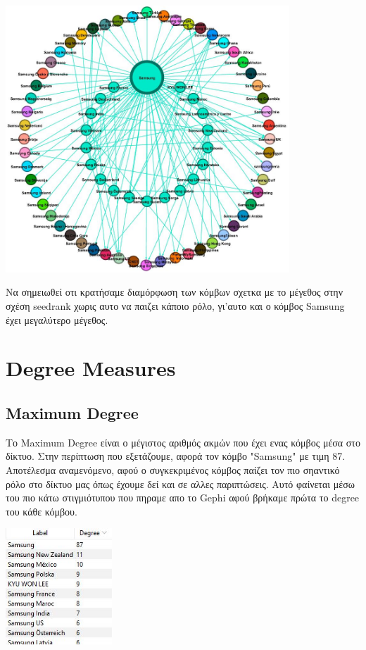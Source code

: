 \documentclass[12pt]{article}
\begin{document}
	\begin{center}
		\includegraphics[width=0.8\textwidth]{photos-files/section5/section5_photo1.JPG}
	\end{center}
	Να σημειωθεί οτι κρατήσαμε διαμόρφωση των κόμβων σχετκα με το μέγεθος στην σχέση seedrank χωρις αυτο να παιζει κάποιο ρόλο, γι'αυτο και ο κόμβος Samsung έχει μεγαλύτερο μέγεθος.
	\label{chap:component_measures_5}
	
	
	\newpage
	\section{Degree Measures}
		
	\subsection{Maximum Degree}
	Το Maximum Degree είναι ο μέγιστος αριθμός ακμών που έχει ενας κόμβος μέσα στο δίκτυο. Στην περίπτωση που εξετάζουμε, αφορά τον κόμβο "Samsung" με τιμη 87. Αποτέλεσμα αναμενόμενο, αφού ο συγκεκριμένος κόμβος παίζει τον πιο σηαντικό ρόλο στο δίκτυο μας όπως έχουμε δεί και σε αλλες παριπτώσεις. Αυτό φαίνεται μέσω του πιο κάτω στιγμιότυπου που πηραμε απο το Gephi αφού βρήκαμε πρώτα το degree του κάθε κόμβου.
	\begin{center}
		\includegraphics[width=0.3\textwidth]{photos-files/section6/maximum_degree.JPG}
	\end{center}
	
\end{document}
